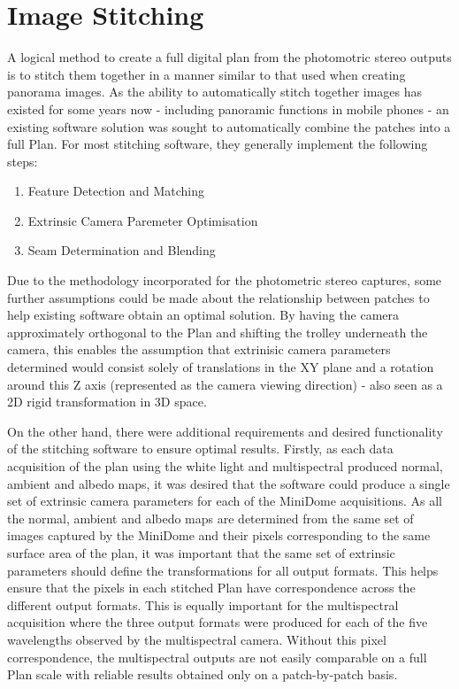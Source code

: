 
\section{Image Stitching}
\label{sec:ImageStitching}
A logical method to create a full digital plan from the photomotric stereo outputs is to stitch them together in a manner similar to that used when creating panorama images. As the ability to automatically stitch together images has existed for some years now - including panoramic functions in mobile phones - an existing software solution was sought to automatically combine the patches into a full Plan. For most stitching software, they generally implement the following steps:
\begin{enumerate}[nosep]
	\label{}
	\item Feature Detection and Matching
	\item Extrinsic Camera Paremeter Optimisation
	\item Seam Determination and Blending
\end{enumerate}

Due to the methodology incorporated for the photometric stereo captures, some further assumptions could be made about the relationship between patches to help existing software obtain an optimal solution. By having the camera approximately orthogonal to the Plan and shifting the trolley underneath the camera, this enables the assumption that extrinisic camera parameters determined would consist solely of translations in the XY plane and a rotation around this Z axis (represented as the camera viewing direction) - also seen as a 2D rigid transformation in 3D space.

On the other hand, there were additional requirements and desired functionality of the stitching software to ensure  optimal results. Firstly, as each data acquisition of the plan using the white light and multispectral produced normal, ambient and albedo maps, it was desired that the software could produce a single set of extrinsic camera parameters for each of the MiniDome acquisitions. As all the normal, ambient and albedo maps are determined from the same set of images captured by the MiniDome and their pixels corresponding to the same surface area of the plan, it was important that the same set of extrinsic parameters should define the transformations for all output formats. This helps ensure that the pixels in each stitched Plan have correspondence across the different output formats. This is equally important for the multispectral acquisition where the three output formats were produced for each of the five wavelengths observed by the multispectral camera. Without this pixel correspondence, the multispectral outputs are not easily comparable on a full Plan scale with reliable results obtained only on a patch-by-patch basis.

